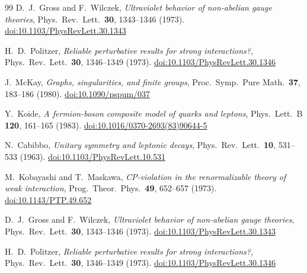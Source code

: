 \documentclass[11pt,a4paper]{article}
\theoremstyle{definition}
\theoremstyle{remark}
\begin{document}
\begin{thebibliography}{99}
D.~J.~Gross and F.~Wilczek,
\textit{Ultraviolet behavior of non-abelian gauge theories},
Phys.\ Rev.\ Lett.\ \textbf{30}, 1343--1346 (1973).
\href{https://doi.org/10.1103/PhysRevLett.30.1343}{doi:10.1103/PhysRevLett.30.1343}

H.~D.~Politzer,
\textit{Reliable perturbative results for strong interactions?},
Phys.\ Rev.\ Lett.\ \textbf{30}, 1346--1349 (1973).
\href{https://doi.org/10.1103/PhysRevLett.30.1346}{doi:10.1103/PhysRevLett.30.1346}

J.~McKay,
\textit{Graphs, singularities, and finite groups},
Proc.\ Symp.\ Pure Math.\ \textbf{37}, 183--186 (1980).
\href{https://doi.org/10.1090/pspum/037}{doi:10.1090/pspum/037}

Y.~Koide,
\textit{A fermion-boson composite model of quarks and leptons},
Phys.\ Lett.\ B \textbf{120}, 161--165 (1983).
\href{https://doi.org/10.1016/0370-2693(83)90644-5}{doi:10.1016/0370-2693(83)90644-5}

N.~Cabibbo,
\textit{Unitary symmetry and leptonic decays},
Phys.\ Rev.\ Lett.\ \textbf{10}, 531--533 (1963).
\href{https://doi.org/10.1103/PhysRevLett.10.531}{doi:10.1103/PhysRevLett.10.531}

M.~Kobayashi and T.~Maskawa,
\textit{CP-violation in the renormalizable theory of weak interaction},
Prog.\ Theor.\ Phys.\ \textbf{49}, 652--657 (1973).
\href{https://doi.org/10.1143/PTP.49.652}{doi:10.1143/PTP.49.652}

D.~J.~Gross and F.~Wilczek,
\textit{Ultraviolet behavior of non-abelian gauge theories},
Phys.\ Rev.\ Lett.\ \textbf{30}, 1343--1346 (1973).
\href{https://doi.org/10.1103/PhysRevLett.30.1343}{doi:10.1103/PhysRevLett.30.1343}

H.~D.~Politzer,
\textit{Reliable perturbative results for strong interactions?},
Phys.\ Rev.\ Lett.\ \textbf{30}, 1346--1349 (1973).
\href{https://doi.org/10.1103/PhysRevLett.30.1346}{doi:10.1103/PhysRevLett.30.1346}

\end{thebibliography}
\end{document}
